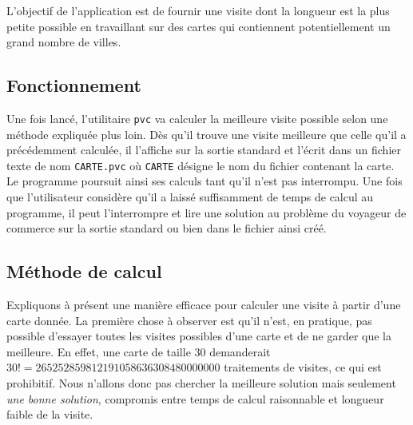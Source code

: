 \documentclass[12pt]{article}
\theoremstyle{definition}
\begin{document}
L'objectif de l'application est de fournir une visite dont la longueur
est la plus petite possible en travaillant sur des cartes qui
contiennent potentiellement un grand nombre de villes.
\medskip

\subsection*{\centering Fonctionnement}
Une fois lancé, l'utilitaire {\tt pvc} va calculer la meilleure visite
possible selon une méthode expliquée plus loin. Dès qu'il trouve une
visite meilleure que celle qu'il a précédemment calculée, il l'affiche
sur la sortie standard et l'écrit dans un fichier texte de nom
{\tt CARTE.pvc} où {\tt CARTE} désigne le nom du fichier contenant la
carte. Le programme poursuit ainsi ses calculs tant qu'il n'est
pas interrompu. Une fois que l'utilisateur considère qu'il a laissé
suffisamment de temps de calcul au programme, il peut l'interrompre
et lire une solution au problème du voyageur de commerce sur la sortie
standard ou bien dans le fichier ainsi créé.
\medskip

\subsection*{\centering Méthode de calcul}
Expliquons à présent une manière efficace pour calculer une visite à
partir d'une carte donnée. La première chose à observer est qu'il n'est,
en pratique, pas possible d'essayer toutes les visites possibles d'une
carte et de ne garder que la meilleure. En effet, une carte de taille
$30$ demanderait $30! = 265252859812191058636308480000000$ traitements
de visites, ce qui est prohibitif. Nous n'allons donc pas chercher la
meilleure solution mais seulement {\em une bonne solution}, compromis
entre temps de calcul raisonnable et longueur faible de la visite.
\medskip
\end{document}
